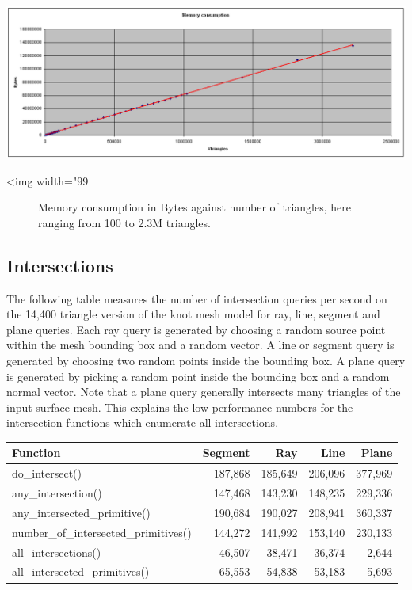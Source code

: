 \begin{center}
    \label{fig:AABB-tree-memory}
    \begin{ccTexOnly}
      \includegraphics[width=1.0\textwidth]{AABB_tree/figs/memory}
    \end{ccTexOnly}
    \begin{ccHtmlOnly}
        <img width="99%
    \end{ccHtmlOnly}
    \begin{figure}[h]
        \caption{Memory consumption in Bytes against number of triangles, here
                 ranging from 100 to 2.3M triangles.}
    \end{figure}
\end{center}



\subsection{Intersections}

The following table measures the number of intersection queries per second on the 14,400 triangle version of the knot mesh model for ray, line, segment and plane queries. Each ray query is generated by choosing a random source point within the mesh bounding box and a random vector. A line or segment query is generated by choosing two random points inside the bounding box. A plane query is generated by picking a random point inside the bounding box and a random normal vector. Note that a plane query generally intersects many triangles of the input surface mesh. This explains the low performance numbers for the intersection functions which enumerate all intersections.

\begin{tabular}{|l|r|r|r|r|}
  \hline
  Function                              & Segment &     Ray &    Line &   Plane \\
  \hline
  do\_intersect()                       & 187,868 & 185,649 & 206,096 & 377,969 \\
  any\_intersection()                   & 147,468 & 143,230 & 148,235 & 229,336 \\
  any\_intersected_primitive()          & 190,684 & 190,027 & 208,941 & 360,337 \\
  number\_of\_intersected\_primitives() & 144,272 & 141,992 & 153,140 & 230,133 \\
  all\_intersections()                  &  46,507 &  38,471 &  36,374 &   2,644 \\
  all\_intersected\_primitives()        &  65,553 &  54,838 &  53,183 &   5,693 \\
  \hline
\end{tabular}

